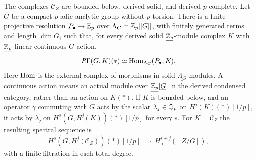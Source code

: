 \begin{lemma}
\label{h3:rat:solid-resolution}
The complexes $\mathscr C_Z$ are bounded below, derived solid, and
derived $p$-complete.  Let $G$ be a compact $p$-adic analytic group
without $p$-torsion.  There is a finite projective resolution
$P_\bullet\to\mathbb Z_p$ over $\Lambda_G=\mathbb Z_p[[G]]$, with finitely
generated terms and length $\dim G$, such that, for every derived
solid $\underline{\mathbb Z_p}$-module complex $K$ with
$\underline{\mathbb Z_p}$-linear continuous $G$-action,
\begin{equation}\label{h3:eq:rat-solid-hom}
 R\Gamma(G,K)(*)\simeq\operatorname{Hom}_{\Lambda_G}(P_\bullet,K).
\end{equation}
Here $\operatorname{Hom}$ is the external complex of morphisms in solid
$\underline{\Lambda_G}$-modules.  A continuous action means an
actual module over $\underline{\mathbb Z_p}[\underline G]$ in the
derived condensed category, rather than an action on $K(*)$.
If $K$ is bounded below, and an operator $\gamma$ commuting with $G$
acts by the scalar $\lambda_j\in\mathbb Q_p$ on $H^j(K)(*)[1/p]$, it
acts by $\lambda_j$ on
$H^s(G,H^j(K))(*)[1/p]$ for every $s$.  For $K=\mathscr C_Z$ the
resulting spectral sequence is
\begin{equation}\label{h3:eq:rat-solid-descent}
 H^s(G,H^j(\mathscr C_Z))(*)[1/p]
       \ \Longrightarrow\ H^{s+j}_{\mathrm b}([Z/G]),
\end{equation}
with a finite filtration in each total degree.
\end{lemma}

